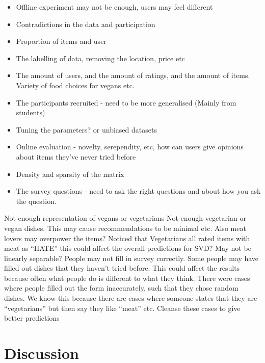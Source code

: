 \begin{itemize}
     \item{Offline experiment may not be enough, users may feel different}
     \item{Contradictions in the data and participation}
     \item{Proportion of items and user}
     \item{The labelling of data, removing the location, price etc}
     \item{The amount of users, and the amount of ratings, and the amount of items. Variety of food choices for vegans etc. }
     \item{The participants recruited - need to be more generalised (Mainly from students)}
     \item{Tuning the parameters? or unbiased datasets}
     \item{Online evaluation - novelty, serependity, etc, how can users give opinions about items they've never tried before}
     \item{Density and sparsity of the matrix}
     \item{The survey questions - need to ask the right questions and about how you ask the question.}
\end{itemize}
Not enough representation of vegans or vegetarians
Not enough vegetarian or vegan dishes. 
This may cause recommendations to be minimal etc.
Also meat lovers may overpower the items?
Noticed that Vegetarians all rated items with meat as “HATE” this could affect the overall predictions for SVD?
May not be linearly separable?
People may not fill in survey correctly.
Some people may have filled out dishes that they haven't tried before. This could affect the results because often what people do is different to what they think. 
There were cases where people filled out the form inaccurately, such that they chose random dishes. We know this because there are cases where someone states that they are “vegetarians” but then say they like “meat” etc.
Cleanse these cases to give better predictions

\section{Discussion}

